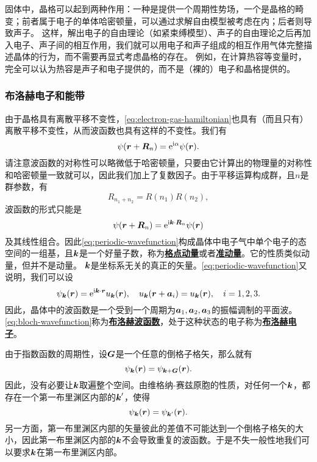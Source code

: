 \documentclass[hyperref, UTF8, a4paper]{ctexart}
\newcommand*{\ii}{\mathrm{i}}
\newcommand*{\ee}{\mathrm{e}}
\newcommand*{\concept}[1]{\underline{\textbf{#1}}}
\begin{document}
固体中，晶格可以起到两种作用：一种是提供一个周期性势场，一个是晶格的畸变；前者属于电子的单体哈密顿量，可以通过求解自由模型被考虑在内；后者则导致声子。
这样，解出电子的自由理论（如紧束缚模型）、声子的自由理论之后再加入电子、声子间的相互作用，我们就可以用电子和声子组成的相互作用气体完整描述晶体的行为，而不需要再显式考虑晶格的存在。
例如，在计算热容等变量时，完全可以认为热容是声子和电子提供的，而不是（裸的）电子和晶格提供的。

\subsubsection{布洛赫电子和能带}\label{sec:energy-band}

由于晶格具有离散平移不变性，\eqref{eq:electron-gas-hamiltonian}也具有（而且只有）离散平移不变性，从而波函数也具有这样的不变性。我们有
\[
    \psi(\vb*{r}+\vb*{R}_n) = \ee^{\ii \alpha} \psi(\vb*{r}).
\]
请注意波函数的对称性可以略微低于哈密顿量，只要由它计算出的物理量的对称性和哈密顿量一致就可以，因此我们加上了复数因子。由于平移运算构成群，且$n$是群参数，有
\[
    R_{n_1+n_2} = R(n_1) R(n_2),
\]
波函数的形式只能是
\begin{equation}
    \psi(\vb*{r}+\vb*{R}_n) = \ee^{\ii \vb*{k} \cdot \vb*{R}_n} \psi(\vb*{r})
    \label{eq:periodic-wavefunction}
\end{equation}
及其线性组合。因此\eqref{eq:periodic-wavefunction}构成晶体中电子气中单个电子的态空间的一组基，且$\vb*{k}$是一个好量子数，称为\concept{格点动量}或者\concept{准动量}。它的性质类似动量，但并不是动量。
$\vb*{k}$是坐标系无关的真正的矢量。\eqref{eq:periodic-wavefunction}又说明，我们可以设
\begin{equation}
    \psi_{\vb*{k}}(\vb*{r}) = \ee^{\ii \vb*{k} \cdot \vb*{r}} u_{\vb*{k}}(\vb*{r}), \quad u_{\vb*{k}}(\vb*{r}+\vb*{a}_i) = u_{\vb*{k}}(\vb*{r}), \quad i = 1, 2, 3.
    \label{eq:bloch-wavefunction}
\end{equation}
因此，晶体中的波函数是一个受到一个周期为$\vb*{a}_1,\vb*{a}_2, \vb*{a}_3$的振幅调制的平面波。
\eqref{eq:bloch-wavefunction}称为\concept{布洛赫波函数}，处于这种状态的电子称为\concept{布洛赫电子}。

由于指数函数的周期性，设$\vb*{G}$是一个任意的倒格子格矢，那么就有
\[
    \psi_{\vb*{k}}(\vb*{r}) = \psi_{\vb*{k}+\vb*{G}}(\vb*{r}).
\]
因此，没有必要让$\vb*{k}$取遍整个空间。由维格纳-赛兹原胞的性质，对任何一个$\vb*{k}$，都存在一个第一布里渊区内部的$\vb*{k}'$，使得
\[
    \psi_{\vb*{k}}(\vb*{r}) = \psi_{\vb*{k}'}(\vb*{r}).
\]
另一方面，第一布里渊区内部的矢量彼此的差值不可能达到一个倒格子格矢的大小，因此第一布里渊区内部的$\vb*{k}$不会导致重复的波函数。于是不失一般性地我们可以要求$\vb*{k}$在第一布里渊区内部。
\end{document}
